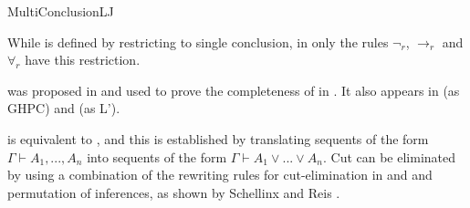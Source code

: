 \begin{entry}{MultiConclusionLJ}
\begin{clarifications}
While \LJ {} is defined by restricting \LK {} to
single conclusion, in \LJmc only the rules $\neg_r$, $\rightarrow_r$ and
$\forall_r$ have this restriction.
\end{clarifications}

\begin{history}
\LJmc was proposed in \cite{Maehara1954} and used to prove the completeness of
\LJ {} in \cite{takeuti87}. 
It also appears in \cite{dragalin88} (as GHPC) and \cite{dummett77} (as L').
\end{history}

\begin{technicalities}
\LJmc is equivalent to \LJ, and this is established by translating
sequents of the form $\Gamma \vdash A_1, ..., A_n$ into 
sequents of the form $\Gamma \vdash A_1 \vee ... \vee A_n$. 
Cut can be eliminated by using a combination of the rewriting
rules for cut-elimination in \LJ and \LK and permutation of inferences, as shown
by Schellinx \cite{Schellinx91} and Reis \cite{GisellePhD}.
\end{technicalities}

\end{entry}
